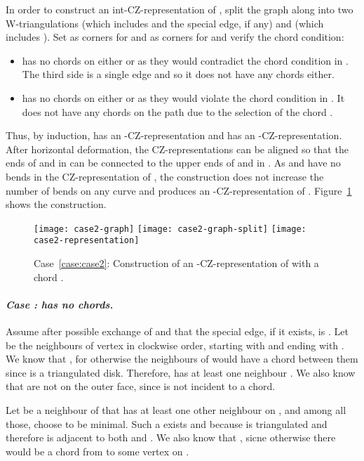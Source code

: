 \documentclass{article}
\renewcommand{\int}[1]{}
\newcounter{thecase} \setcounter{thecase}{0}
\newcommand{\case}[1]{\noindent
            \refstepcounter{thecase}\paragraph*{\textnormal{\textit{Case \arabic{thecase}: #1}}}
}
\begin{document}
In order to construct an int-CZ-representation of , split the graph 
along  into two W-triangulations  (which includes 
and the special edge, if any) and
 (which includes ).  Set
  as corners for  and  as corners for 
and verify the chord condition:

\begin{itemize}
    \item  has no chords on either  or 
        as they would contradict the chord condition in .
        The third side is a single edge  and so it does not have any chords either. 
    \item  has no chords on either  or  as they
    would violate the chord condition in . It does not have any chords on the path  due to 
    the selection of the chord . 
\end{itemize}

Thus, by induction,  has an \int{F}-CZ-representation and  has
an \int{(b_j,c_k)}-CZ-representation. 
After horizontal deformation, the CZ-representations can be aligned 
so that the ends of  and  in  can be connected to the upper ends of 
and  in . 
As  and  have no bends in the CZ-representation of , the
construction does not increase the number of bends on any curve and produces 
an \int{F}-CZ-representation of . 
Figure~\ref{fig:case2-construction} shows the construction. 


\begin{figure}
\begin{center}
\texttt{[image: case2-graph]}\hspace{2em}
\texttt{[image: case2-graph-split]}\hspace{3em}
\texttt{[image: case2-representation]}
\end{center}
\caption{Case~\ref{case:case2}: Construction of an \int{F}-CZ-representation of 
    with a chord .}
\label{fig:case2-construction}
\end{figure}


\case{ has no chords.}
\label{case:chordless}
Assume after possible exchange of  and  that the special edge, if it exists, is .
Let  be the neighbours of vertex  in clockwise order, starting
with  and ending with .  We know that , for
otherwise the neighbours of  would have a chord between them since  is a 
triangulated disk.  Therefore,  has at least one neighbour
.  We also know that  are not on the outer 
face, since  is not incident to a chord.

Let  be a neighbour of  that has at least one other neighbour on 
, and among all those, choose  to be minimal. Such a
 exists and   because  is triangulated and 
therefore  is adjacent to both  and .   
We also know that , sicne otherwise there would be a chord from
 to some vertex on .
\end{document}
